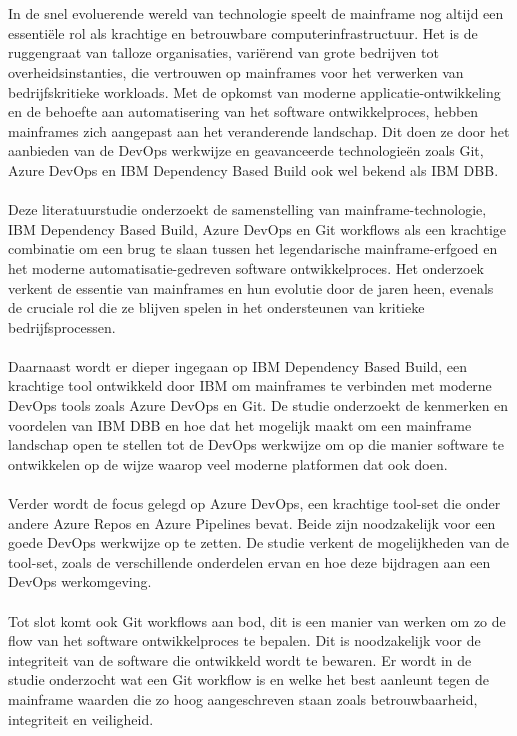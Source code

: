 \chapter{}%
\label{ch:stand-van-zaken}
In de snel evoluerende wereld van technologie speelt de mainframe nog altijd een essentiële rol als krachtige en betrouwbare computerinfrastructuur. Het is de ruggengraat van talloze organisaties, variërend van grote bedrijven tot overheidsinstanties, die vertrouwen op mainframes voor het verwerken van bedrijfskritieke workloads. Met de opkomst van moderne applicatie-ontwikkeling en de behoefte aan automatisering van het software ontwikkelproces, hebben mainframes zich aangepast aan het veranderende landschap. Dit doen ze door het aanbieden van de DevOps werkwijze en geavanceerde technologieën zoals Git, Azure DevOps en IBM Dependency Based Build ook wel bekend als IBM DBB.
\\ \\
Deze literatuurstudie onderzoekt de samenstelling van mainframe-technologie, IBM Dependency Based Build, Azure DevOps en Git workflows als een krachtige combinatie om een brug te slaan tussen het legendarische mainframe-erfgoed en het moderne automatisatie-gedreven software ontwikkelproces. Het onderzoek verkent de essentie van mainframes en hun evolutie door de jaren heen, evenals de cruciale rol die ze blijven spelen in het ondersteunen van kritieke bedrijfsprocessen.
\\ \\
Daarnaast wordt er dieper ingegaan op IBM Dependency Based Build, een krachtige tool ontwikkeld door IBM om mainframes te verbinden met moderne DevOps tools zoals Azure DevOps en Git. De studie onderzoekt de kenmerken en voordelen van IBM DBB en hoe dat het mogelijk maakt om een mainframe landschap open te stellen tot de DevOps werkwijze om op die manier software te ontwikkelen op de wijze waarop veel moderne platformen dat ook doen.
\\ \\
Verder wordt de focus gelegd op Azure DevOps, een krachtige tool-set die onder andere Azure Repos en Azure Pipelines bevat. Beide zijn noodzakelijk voor een goede DevOps werkwijze op te zetten. De studie verkent de mogelijkheden van de tool-set, zoals de verschillende onderdelen ervan en hoe deze bijdragen aan een DevOps werkomgeving.
\\ \\
Tot slot komt ook Git workflows aan bod, dit is een manier van werken om zo de flow van het software ontwikkelproces te bepalen. Dit is noodzakelijk voor de integriteit van de software die ontwikkeld wordt te bewaren. Er wordt in de studie onderzocht wat een Git workflow is en welke het best aanleunt tegen de mainframe waarden die zo hoog aangeschreven staan zoals betrouwbaarheid, integriteit en veiligheid.
\\ \\
